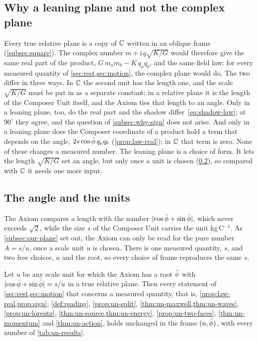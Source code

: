 \subsection{Why a leaning plane and not the complex plane}\label{subsec:why-lean}

Every true relative plane is a copy of $\mathbb{C}$ written in an oblique frame (\cref{subsec:square}). The complex number $m + \mathrm{i}\,q\sqrt{K/G}$ would therefore give the same real part of the product, $G\,m_a m_b - K\,q_a q_b$, and the same field law: for every measured quantity of \cref{sec:rest,sec:motion}, the complex plane would do. The two differ in three ways. In $\mathbb{C}$ the second unit has the length one, and the scale $\sqrt{K/G}$ must be put in as a separate constant; in a relative plane it is the length of the Composer Unit itself, and the Axiom ties that length to an angle. Only in a leaning plane, too, do the real part and the shadow differ~\cref{eq:shadow-law}; at $90^\circ$ they agree, and the question of \cref{subsec:why-sign} does not arise. And only in a leaning plane does the Composer coordinate of a product hold a term that depends on the angle, $2s\cos\bar{\phi}\,q_a q_b$ (\cref{prop:law-real}); in $\mathbb{C}$ that term is zero. None of these changes a measured number. The leaning plane is a choice of form. It lets the length $\sqrt{K/G}$ set an angle, but only once a unit is chosen (\cref{subsec:angle-units}), so compared with $\mathbb{C}$ it needs one more input.

\subsection{The angle and the units}\label{subsec:angle-units}

The Axiom compares a length with the number $\lvert\cos\bar{\phi} + \sin\bar{\phi}\rvert$, which never exceeds $\sqrt2$, while the size $s$ of the Composer Unit carries the unit kg\,C$^{-1}$. As \cref{subsec:our-plane} set out, the Axiom can only be read for the pure number $A = s/u$, once a scale unit $u$ is chosen. There is one measured quantity, $s$, and two free choices, $u$ and the root, so every choice of frame reproduces the same $s$.

\begin{proposition}\label{prop:angle-invariance}
Let $u$ be any scale unit for which the Axiom has a root $\bar{\phi}$ with $\lvert\cos\bar{\phi} + \sin\bar{\phi}\rvert = s/u$ in a true relative plane. Then every statement of \cref{sec:rest,sec:motion} that concerns a measured quantity, that is, \cref{prop:law-real,prop:sign}, \cref{def:reading}, \cref{prop:un-split}, \cref{thm:un-maxwell,thm:un-waves}, \cref{prop:un-lorentz}, \cref{thm:un-source,thm:un-energy}, \cref{prop:un-two-faces}, \cref{thm:un-momentum} and \cref{thm:un-action}, holds unchanged in the frame $(u, \bar{\phi})$, with every number of \cref{tab:un-results}.
\end{proposition}

